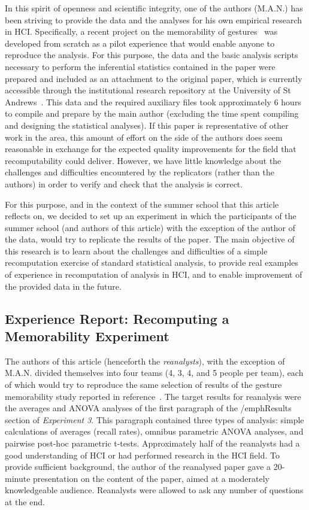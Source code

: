 In this spirit of openness and scientific integrity, one of the authors (M.A.N.) has been striving to provide the data and the analyses for his own empirical research in HCI. Specifically, a recent project on the memorability of gestures~\cite{Nacenta:memorability} was developed from scratch as a pilot experience that would enable anyone to reproduce the analysis. For this purpose, the data and the basic analysis scripts necessary to perform the inferential statistics contained in the paper were prepared and included as an attachment to the original paper, which is currently accessible through the institutional research repository at the University of St Andrews~\cite{Nacenta:memorability_data}. This data and the required auxiliary files took approximately 6 hours to compile and prepare by the main author (excluding the time spent compiling and designing the statistical analyses). If this paper is representative of other work in the area, this amount of effort on the side of the authors does seem reasonable in exchange for the expected quality improvements for the field that recomputability could deliver. However, we have little knowledge about the challenges and difficulties encountered by the replicators (rather than the authors) in order to verify and check that the analysis is correct.

For this purpose, and in the context of the summer school that this article reflects on, we decided to set up an experiment in which the participants of the summer school (and authors of this article) with the exception of the author of the data, would try to replicate the results of the paper. The main objective of this research is to learn about the challenges and difficulties of a simple recomputation exercise of standard statistical analysis, to provide real examples of experience in recomputation of analysis in HCI, and to enable improvement of the provided data in the future.

\subsection{Experience Report: Recomputing a Memorability Experiment}
The authors of this article (henceforth the \emph{reanalysts}), with the exception of
M.A.N. divided themselves into four teams (4, 3, 4, and 5 people per team), each of which would try to reproduce the same selection of results of the gesture memorability study reported in reference~\cite{Nacenta:memorability}. The target results for reanalysis were the averages and ANOVA analyses of the first paragraph of the /emph{Results} section of \emph{Experiment 3}. This paragraph contained three types of analysis: simple calculations of averages (recall rates), omnibus parametric ANOVA analyses, and pairwise post-hoc parametric t-tests. Approximately half of the reanalysts had a good understanding of HCI or had performed research in the HCI field. To provide sufficient background, the author of the reanalysed paper gave a 20-minute presentation on the content of the paper, aimed at a moderately knowledgeable audience. Reanalysts were allowed to ask any number of questions at the end.

